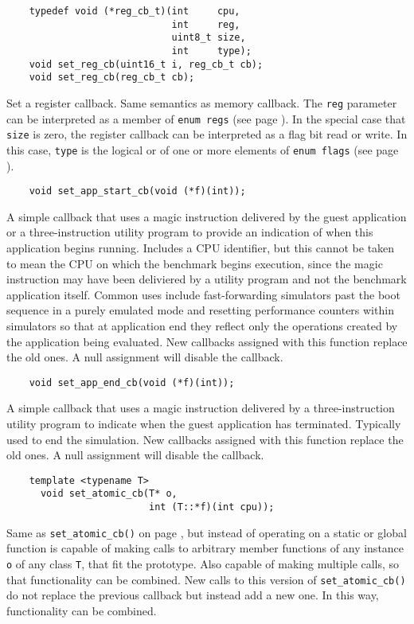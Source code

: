 \documentclass[letterpaper, 10pt]{book}
\begin{document}
\label{func:set_reg_cb} \begin{verbatim}
    typedef void (*reg_cb_t)(int     cpu,
                             int     reg,
                             uint8_t size,
                             int     type);
    void set_reg_cb(uint16_t i, reg_cb_t cb);
    void set_reg_cb(reg_cb_t cb);
\end{verbatim}
Set a register callback. Same semantics as memory callback. The \texttt{reg}
parameter can be interpreted as a member of \texttt{enum regs} (see page 
\pageref{enum:regs}). In the special case that \texttt{size} is zero, the
register callback can be interpreted as a flag bit read or write. In this case,
\texttt{type} is the logical or of one or more elements of \texttt{enum flags}
(see page \pageref{enum flags}).

\label{func:set_app_start_cb} \begin{verbatim}
    void set_app_start_cb(void (*f)(int));
\end{verbatim}
A simple callback that uses a magic instruction delivered by the guest 
application or a three-instruction utility program to provide an indication of
when this application begins running. Includes a CPU identifier, but
this cannot be taken to mean the CPU on which the benchmark begins execution,
since the magic instruction may have been deliviered by a utility program and
not the benchmark application itself. Common uses include fast-forwarding 
simulators past the boot sequence in a purely emulated mode and resetting
performance counters within simulators so that at application end they reflect
only the operations created by the application being evaluated. New callbacks
assigned with this function replace the old ones. A null assignment will
disable the callback.

\label{func:set_app_end_cb} \begin{verbatim}
    void set_app_end_cb(void (*f)(int));
\end{verbatim}
A simple callback that uses a magic instruction delivered by a 
three-instruction utility program to indicate when the guest application has
terminated. Typically used to end the simulation. New callbacks
assigned with this function replace the old ones. A null assignment will
disable the callback.

\label{tf:set_atomic_cb} \begin{verbatim}
    template <typename T> 
      void set_atomic_cb(T* o, 
                         int (T::*f)(int cpu));
\end{verbatim}
Same as \texttt{set\_atomic\_cb()} on page \pageref{func:set_atomic_cb}, but
instead of operating on a static or global function is capable of making calls
to arbitrary member functions of any instance \texttt{o} of any class 
\texttt{T}, that fit the prototype. Also capable of making
multiple calls, so that functionality can be combined. New calls to this
version of \texttt{set\_atomic\_cb()} do not replace the previous callback but
instead add a new one. In this way, functionality can be combined.
\end{document}
